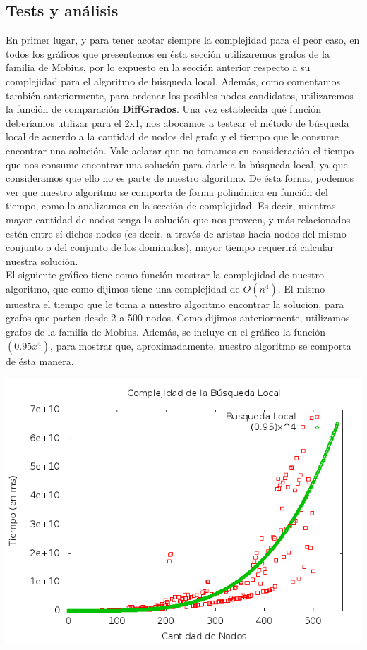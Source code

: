 \subsection{Tests y análisis}
En primer lugar, y para tener acotar siempre la complejidad para el peor caso, en todos los gráficos que presentemos en ésta sección utilizaremos grafos de la familia de Mobius, por lo expuesto en la sección anterior respecto a su complejidad para el algoritmo de búsqueda local. Además, como comentamos también anteriormente, para ordenar los posibles nodos candidatos, utilizaremos la función de comparación \textbf{DiffGrados}.
Una vez establecida qué función deberíamos utilizar para el 2x1, nos abocamos a testear el método de búsqueda local de acuerdo a la cantidad de nodos del grafo y el tiempo que le consume encontrar una solución. Vale aclarar que no tomamos en consideración el tiempo que nos consume encontrar una solución para darle a la búsqueda local, ya que consideramos que ello no es parte de nuestro algoritmo. De ésta forma, podemos ver que nuestro algoritmo se comporta de forma polinómica en función del tiempo, como lo analizamos en la sección de complejidad. Es decir, mientras mayor cantidad de nodos tenga la solución que nos proveen, y más relacionados estén entre sí dichos nodos (es decir, a través de aristas hacia nodos del mismo conjunto o del conjunto de los dominados), mayor tiempo requerirá calcular nuestra solución. \\
El siguiente gráfico tiene como función mostrar la complejidad de nuestro algoritmo, que como dijimos tiene una complejidad de $O(n^4)$. El mismo muestra el tiempo que le toma a nuestro algoritmo encontrar la solucion, para grafos que parten desde 2 a 500 nodos. Como dijimos anteriormente, utilizamos grafos de la familia de Mobius. Además, se incluye en el gráfico la función $(0.95x^4)$, para mostrar que, aproximadamente, nuestro algoritmo se comporta de ésta manera.  \\
\begin{center}
\includegraphics[width=17cm]{./graficos/complejidadLocal.png}
\end{center}

